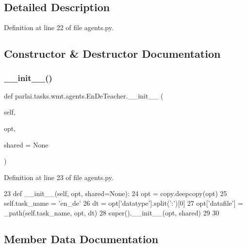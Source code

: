 \subsection{Detailed Description}


Definition at line 22 of file agents.\+py.



\subsection{Constructor \& Destructor Documentation}
\mbox{\label{classparlai_1_1tasks_1_1wmt_1_1agents_1_1EnDeTeacher_ac069783e0b57da33c6d1b1ff8d9791bc}} 
\subsubsection{\texorpdfstring{\+\_\+\+\_\+init\+\_\+\+\_\+()}{\_\_init\_\_()}}
{\footnotesize\ttfamily def parlai.\+tasks.\+wmt.\+agents.\+En\+De\+Teacher.\+\_\+\+\_\+init\+\_\+\+\_\+ (\begin{DoxyParamCaption}\item[{}]{self,  }\item[{}]{opt,  }\item[{}]{shared = {\ttfamily None} }\end{DoxyParamCaption})}



Definition at line 23 of file agents.\+py.


\begin{DoxyCode}
23     \textcolor{keyword}{def }\_\_init\_\_(self, opt, shared=None):
24         opt = copy.deepcopy(opt)
25         self.task\_name = \textcolor{stringliteral}{'en\_de'}
26         dt = opt[\textcolor{stringliteral}{'datatype'}].split(\textcolor{stringliteral}{':'})[0]
27         opt[\textcolor{stringliteral}{'datafile'}] = \_path(self.task\_name, opt, dt)
28         super().\_\_init\_\_(opt, shared)
29 
30 
\end{DoxyCode}


\subsection{Member Data Documentation}
\mbox{\label{classparlai_1_1tasks_1_1wmt_1_1agents_1_1EnDeTeacher_a694d05cdfc00638200d219f8bfc9b595}} 
